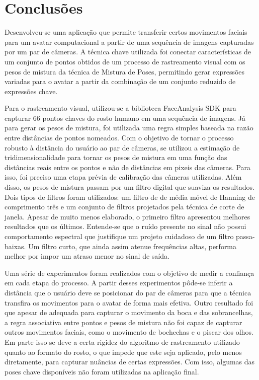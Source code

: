 \chapter{Conclusões}

\label{CapConclusoes}

Desenvolveu-se uma aplicação que permite transferir certos movimentos faciais
para um avatar computacional a partir de uma sequência de imagens capturadas por
um par de câmeras. A técnica chave utilizada foi conectar características de um
conjunto de pontos obtidos de um processo de rastreamento visual com os pesos de
mistura da técnica de Mistura de Poses, permitindo gerar expressões variadas
para o avatar a partir da combinação de um conjunto reduzido de expressões
chave. 

Para o rastreamento visual, utilizou-se a biblioteca FaceAnalysis SDK para
capturar 66 pontos chaves do rosto humano em uma sequência de imagens. Já para
gerar os pesos de mistura, foi utilizada uma regra simples baseada na razão
entre distâncias de pontos nomeados. Com o objetivo de tornar o processo robusto
à distância do usuário ao par de câmeras, se utilizou a estimação de
tridimensionalidade para tornar os pesos de mistura em uma função das distâncias
reais entre os pontos e não de distâncias em pixeis das câmeras. Para isso, foi
preciso uma etapa prévia de calibração das câmeras utilizadas. Além disso, os
pesos de mistura passam por um filtro digital que suaviza os resultados. Dois
tipos de filtros foram utilizados: um filtro de de média móvel de Hanning de
comprimento três e um conjunto de filtros projetados pela técnica de corte de
janela.  Apesar de muito menos elaborado, o primeiro filtro apresentou melhores
resultados que os últimos. Entende-se que o ruído presente no sinal não possui
comportamento espectral que justifique um projeto cuidadoso de um filtro
passa-baixas. Um filtro curto, que ainda assim atenue frequências altas,
performa melhor por impor um atraso menor no sinal de saída.

Uma série de experimentos foram realizados com o objetivo de medir a confiança
em cada etapa do processo. A partir desses experimentos pôde-se inferir a
distância que o usuário deve se posicionar do par de câmeras para que a técnica
transfira os movimentos para o avatar de forma mais efetiva. Outro resultado foi
que apesar de adequada para capturar o movimento da boca e das sobrancelhas, a
regra associativa entre pontos e pesos de mistura não foi capaz de capturar
outros movimentos faciais, como o movimento de bochechas e o piscar dos olhos.
Em parte isso se deve a certa rigidez do algoritmo de rastreamento utilizado
quanto ao formato do rosto, o que impede que este seja aplicado, pelo menos
diretamente, para capturar nuâncias de certas expressões. Com isso, algumas das
poses chave disponíveis não foram utilizadas na aplicação final.

